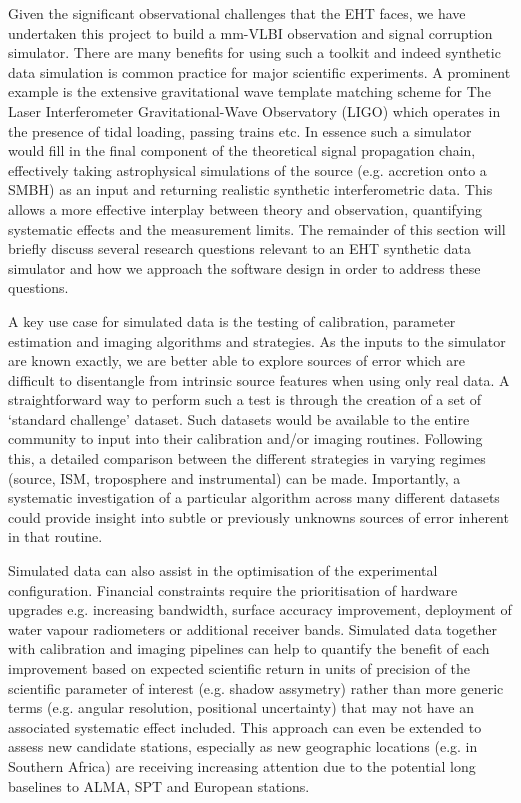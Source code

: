 {%
Given the significant observational challenges that the EHT faces, we have undertaken this project to build a mm-VLBI observation and signal corruption simulator. There are many benefits for using such a toolkit and indeed synthetic data simulation is common practice for major scientific experiments. A prominent example is the extensive gravitational wave template matching scheme for The Laser Interferometer Gravitational-Wave Observatory (LIGO) which operates in the presence of tidal loading, passing trains etc. In essence such a simulator would fill in the final component of the theoretical signal propagation chain, effectively taking astrophysical simulations of the source (e.g. accretion onto a SMBH) as an input and returning realistic synthetic interferometric data. This allows a more effective interplay between theory and observation, quantifying systematic effects and the measurement limits. The remainder of this section will briefly discuss several research questions relevant to an EHT synthetic data simulator and how we approach the software design in order to address these questions. 


A key use case for simulated data is the testing of calibration, parameter estimation and imaging algorithms and strategies. As the inputs to the simulator are known exactly, we are better able to explore sources of error which are difficult to disentangle from intrinsic source features when using only real data. A straightforward way to perform such a test is through the creation of a set of `standard challenge' dataset. Such datasets would be available to the entire community to input into their calibration and/or imaging routines. Following this, a detailed comparison between the different strategies in varying regimes (source, ISM, troposphere and instrumental) can be made. Importantly, a systematic investigation of a particular algorithm across many different datasets could provide insight into subtle or previously unknowns sources of error inherent in that routine.


Simulated data can also assist in the optimisation of the experimental configuration. Financial constraints require the prioritisation of hardware upgrades e.g. increasing bandwidth, surface accuracy improvement, deployment of water vapour radiometers or additional receiver bands. Simulated data together with calibration and imaging pipelines can help to quantify the benefit of each improvement based on expected scientific return in units of precision of the scientific parameter of interest (e.g. shadow assymetry) rather than more generic terms (e.g. angular resolution, positional uncertainty) that may not have an associated systematic effect included. This approach can even be extended to assess new candidate stations, especially as new geographic locations (e.g. in Southern Africa) are receiving increasing attention due to the potential long baselines to ALMA, SPT and European stations.


}
